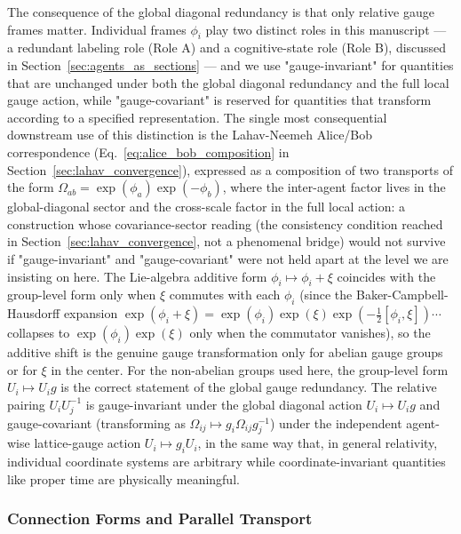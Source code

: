 \documentclass[11pt]{article}
\begin{document}
The consequence of the global diagonal redundancy is that only relative gauge frames matter. Individual frames $\phi_i$ play two distinct roles in this manuscript — a redundant labeling role (Role A) and a cognitive-state role (Role B), discussed in Section~\ref{sec:agents_as_sections} — and we use "gauge-invariant" for quantities that are unchanged under both the global diagonal redundancy and the full local gauge action, while "gauge-covariant" is reserved for quantities that transform according to a specified representation. The single most consequential downstream use of this distinction is the Lahav-Neemeh Alice/Bob correspondence (Eq.~\ref{eq:alice_bob_composition} in Section~\ref{sec:lahav_convergence}), expressed as a composition of two transports of the form $\Omega_{ab} = \exp(\phi_a)\exp(-\phi_b)$, where the inter-agent factor lives in the global-diagonal sector and the cross-scale factor in the full local action: a construction whose covariance-sector reading (the consistency condition reached in Section~\ref{sec:lahav_convergence}, not a phenomenal bridge) would not survive if "gauge-invariant" and "gauge-covariant" were not held apart at the level we are insisting on here. The Lie-algebra additive form $\phi_i \mapsto \phi_i + \xi$ coincides with the group-level form only when $\xi$ commutes with each $\phi_i$ (since the Baker-Campbell-Hausdorff expansion $\exp(\phi_i + \xi) = \exp(\phi_i)\exp(\xi)\exp(-\tfrac12 [\phi_i, \xi]) \cdots$ collapses to $\exp(\phi_i)\exp(\xi)$ only when the commutator vanishes), so the additive shift is the genuine gauge transformation only for abelian gauge groups or for $\xi$ in the center. For the non-abelian groups used here, the group-level form $U_i \mapsto U_i g$ is the correct statement of the global gauge redundancy. The relative pairing $U_i U_j^{-1}$ is gauge-invariant under the global diagonal action $U_i \mapsto U_i g$ and gauge-covariant (transforming as $\Omega_{ij} \mapsto g_i \Omega_{ij} g_j^{-1}$) under the independent agent-wise lattice-gauge action $U_i \mapsto g_i U_i$, in the same way that, in general relativity, individual coordinate systems are arbitrary while coordinate-invariant quantities like proper time are physically meaningful.

\subsubsection{Connection Forms and Parallel Transport}
\label{sec:connection_forms}
\end{document}
